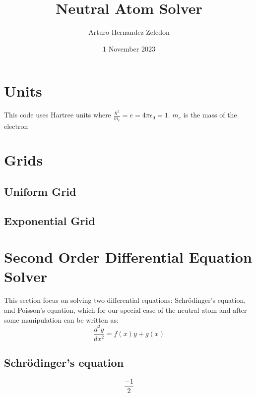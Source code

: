 \documentclass[11pt]{article}
\title{ Neutral Atom Solver}
\author{ Arturo Hernandez Zeledon }
\date{1 November 2023}
\begin{document}
\maketitle	
\pagebreak



\section{Units}
This code uses Hartree units where $\frac{\hbar^2}{m_e} = e = 4\pi\epsilon_0 = 1$. $m_e$
is the mass of the electron

\section{Grids}

\subsection{Uniform Grid}


\subsection{Exponential Grid}


\pagebreak
\section{Second Order Differential Equation Solver}
This section focus on solving two differential equations: Schrödinger's equation, and 
Poisson's equation, which for our special case of the neutral atom
 and after some manipulation can be written as:
 \begin{equation}
    \frac{d^2y}{dx^2} = f(x)y + g(x)
 \end{equation}

\subsection{Schrödinger's equation}

\begin{equation}
    \frac{-1}{2}
\end{equation}


\end{document}

